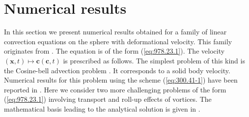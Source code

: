 
\section{Numerical results}
In this section we present numerical results obtained
for a family of linear convection equations on the sphere 
with deformational velocity. This family
originates from \cite{Nair-Cote-Stanisforth, Nair-Machenhauer, Nair-Jablonowski}.
The equation is of the form (\ref{eq:978.23.1}).
The velocity $(\mathbf{x},t) \mapsto \mathbf{c}(\mathbf{c},t)$ is prescribed as follows.
The simplest problem of this kind is the Cosine-bell 
advection problem \cite{Swarztrauber-Williamson-Drake}. It corresponds
to a solid body velocity.
Numerical results for this problem
using the scheme (\ref{eq:300.41-1})
have been reported in 
\cite{Croisille-10}. 
Here we consider two more challenging problems of the form
(\ref{eq:978.23.1}) involving transport and roll-up effects
of vortices. 
The mathematical basis leading 
to the analytical solution is given in
\cite{Nair-Cote-Stanisforth}.
